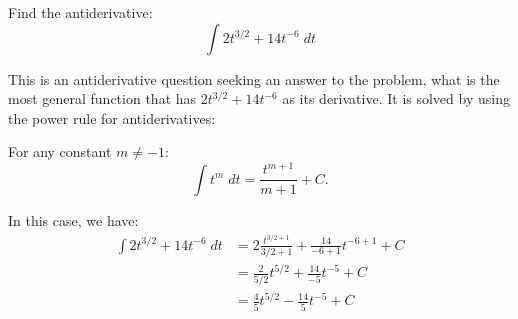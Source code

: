 \documentclass{ximera}
\author{Emma Smith Zbarsky}
\begin{document}
\begin{exercise}

Find the antiderivative: \[\int 2t^{3/2}+14t^{-6}\; dt\]


\begin{hint}
This is an antiderivative question seeking an answer to the problem,
what is the most general function that has $2t^{3/2}+14t^{-6}$ as its
derivative. It is solved by using the power rule for antiderivatives:

For any constant $m \neq -1$:
\[\int t^{m} \; dt = \frac{t^{m+1}}{m+1}+C.\]
\end{hint}


\begin{hint}
In this case, we have: \begin{align*}
\int 2t^{3/2} + 14t^{-6}\; dt &= 2\frac{t^{3/2+1}}{3/2+1}+\frac{14}{-6+1}t^{-6+1} +C \\
&= \frac{2}{5/2}t^{5/2}+\frac{14}{-5}t^{-5}+C \\
&= \frac{4}{5}t^{5/2}-\frac{14}{5}t^{-5}+C
\end{align*}
\end{hint}


\begin{multipleChoice}
\end{multipleChoice}

\end{exercise}
\end{document}
